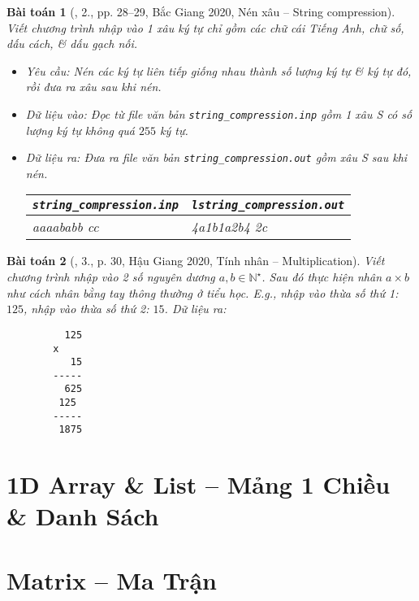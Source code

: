 \documentclass{article}
\newtheorem{baitoan}{Bài toán}
\begin{document}
\begin{baitoan}[\cite{VietSTEM2021}, 2., pp. 28--29, Bắc Giang 2020, Nén xâu -- String compression]
	Viết chương trình nhập vào 1 xâu ký tự chỉ gồm các chữ cái Tiếng Anh, chữ số, dấu cách, \& dấu gạch nối.
	\begin{itemize}
		\item {\sf Yêu cầu:} Nén các ký tự liên tiếp giống nhau thành số lượng ký tự \& ký tự đó, rồi đưa ra xâu sau khi nén.
		\item {\sf Dữ liệu vào:} Đọc từ file văn bản \verb|string_compression.inp| gồm 1 xâu S có số lượng ký tự không quá $255$ ký tự.
		\item {\sf Dữ liệu ra:} Đưa ra file văn bản \verb|string_compression.out| gồm xâu S sau khi nén.
		\begin{table}[H]
			\centering
			\begin{tabular}{|l|l|}
				\hline
				\verb|string_compression.inp| & \verb|lstring_compression.out| \\
				\hline
				aaaababb    cc & 4a1b1a2b4 2c \\
				\hline
			\end{tabular}
		\end{table}
	\end{itemize}
\end{baitoan}

\begin{baitoan}[\cite{VietSTEM2021}, 3., p. 30, Hậu Giang 2020, Tính nhân -- Multiplication]
	Viết chương trình nhập vào 2 số nguyên dương $a,b\in\mathbb{N}^\star$. Sau đó thực hiện nhân $a\times b$ như cách nhân bằng tay thông thường ở tiểu học. E.g., nhập vào thừa số thứ 1: $125$, nhập vào thừa số thứ 2: $15$. {\sf Dữ liệu ra:}
	\begin{verbatim}
		  125
		x
		   15
		-----
		  625
		 125
		-----
		 1875
	\end{verbatim}
\end{baitoan}


\section{1D Array \& List -- Mảng 1 Chiều \& Danh Sách}


\section{Matrix -- Ma Trận}
\end{document}
